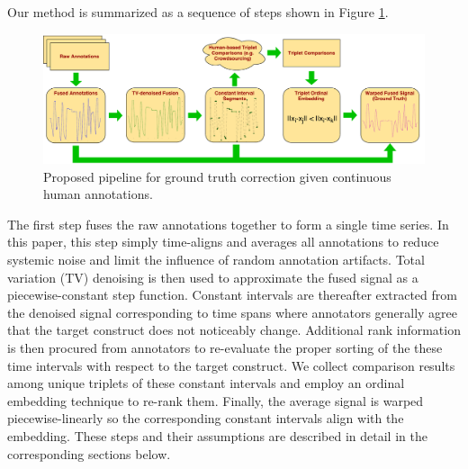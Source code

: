 \documentclass[times,twocolumn,final,authoryear]{elsarticle}
\begin{document}
Our method is summarized as a sequence of steps shown in Figure \ref{fig:pipeline}.
\begin{figure}[t]
	\centering
	\includegraphics[width=\textwidth]{images/RankBasedSignalWarpingPipeline}
	\caption{Proposed pipeline for ground truth correction given continuous human annotations.}
	\label{fig:pipeline}
\end{figure}

The first step fuses the raw annotations together to form a single time series.  In this paper, this step simply time-aligns and averages all annotations to reduce systemic noise and limit the influence of random annotation artifacts.  Total variation (TV) denoising is then used to approximate the fused signal as a piecewise-constant step function.  Constant intervals are thereafter extracted from the denoised signal corresponding to time spans where annotators generally agree that the target construct does not noticeably change.  Additional rank information is then procured from annotators to re-evaluate the proper sorting of the these time intervals with respect to the target construct.  We collect comparison results among unique triplets of these constant intervals and employ an ordinal embedding technique to re-rank them.  Finally, the average signal is warped piecewise-linearly so the corresponding constant intervals align with the embedding.  These steps and their assumptions are described in detail in the corresponding sections below.
\end{document}
